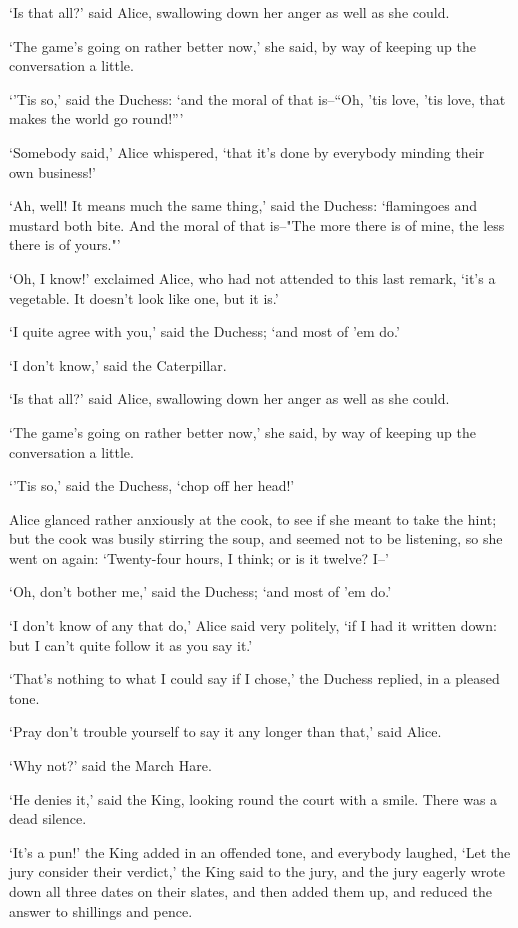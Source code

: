 \documentclass[statementpaper,twoside,openany]{memoir}
\begin{document}
`Is that all?' said Alice, swallowing down her anger as well as she could.

`The game's going on rather better now,' she said, by way of keeping up the conversation a little.

`'Tis so,' said the Duchess: `and the moral of that is--``Oh, 'tis love, 'tis love, that makes the world go round!'''

`Somebody said,' Alice whispered, `that it's done by everybody minding their own business!'

`Ah, well! It means much the same thing,' said the Duchess: `flamingoes and mustard both bite. And the moral of that is--"The more there is of mine, the less there is of yours."'

`Oh, I know!' exclaimed Alice, who had not attended to this last remark, `it's a vegetable. It doesn't look like one, but it is.'

`I quite agree with you,' said the Duchess; `and most of 'em do.'

`I don't know,' said the Caterpillar.

`Is that all?' said Alice, swallowing down her anger as well as she could.

`The game's going on rather better now,' she said, by way of keeping up the conversation a little.

`'Tis so,' said the Duchess, `chop off her head!'

Alice glanced rather anxiously at the cook, to see if she meant to take the hint; but the cook was busily stirring the soup, and seemed not to be listening, so she went on again: `Twenty-four hours, I think; or is it twelve? I--'

`Oh, don't bother me,' said the Duchess; `and most of 'em do.'

`I don't know of any that do,' Alice said very politely, `if I had it written down: but I can't quite follow it as you say it.'

`That's nothing to what I could say if I chose,' the Duchess replied, in a pleased tone.

`Pray don't trouble yourself to say it any longer than that,' said Alice.

`Why not?' said the March Hare.

`He denies it,' said the King, looking round the court with a smile. There was a dead silence.

`It's a pun!' the King added in an offended tone, and everybody laughed, `Let the jury consider their verdict,' the King said to the jury, and the jury eagerly wrote down all three dates on their slates, and then added them up, and reduced the answer to shillings and pence.
\end{document}
